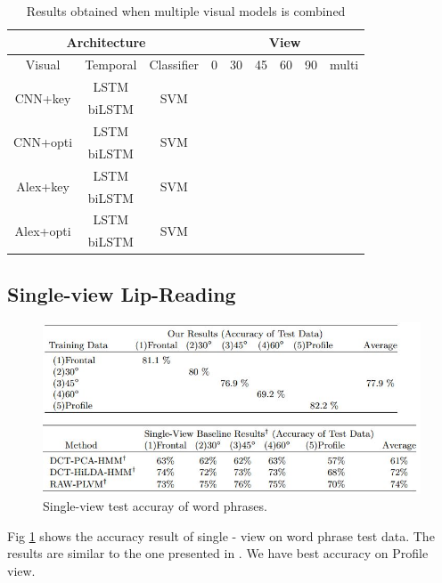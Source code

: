 \begin{table}[h]
\centering
    \begin{tabular}{ccc|cccccc}
        \multicolumn{3}{c|}{Architecture} &%
        \multicolumn{6}{c}{View}\\ \hline
        Visual  & Temporal & Classifier &%
        0& 30 & 45 & 60 & 90 & multi\\\hline
        \multirow{2}{*}{CNN+key}%
        & LSTM & \multirow{2}{*}{SVM} &%
        & & & & &\\
        & biLSTM & &%
        & & & & &\\
        \multirow{2}{*}{CNN+opti}%
        & LSTM & \multirow{2}{*}{SVM} &%
        & & & & &\\
        & biLSTM & &%
        & & & & &\\
        \multirow{2}{*}{Alex+key}%
        & LSTM & \multirow{2}{*}{SVM} &%
        & & & & &\\
        & biLSTM & &%
        & & & & &\\
        \multirow{2}{*}{Alex+opti}%
        & LSTM & \multirow{2}{*}{SVM} &%
        & & & & &\\
        & biLSTM & &%
        & & & & &\\
    \end{tabular}
    \caption{Results obtained when multiple visual models is combined}
    \label{tab:resDiffArch}
\end{table}


\subsection{Single-view Lip-Reading}

\begin{figure}[h]
	\centering
	\includegraphics[width=\columnwidth]{fig/s1.jpg}
	\caption{Single-view test accuray of word phrases.}
	\label{fig:s1}
\end{figure}
Fig \ref{fig:s1} shows the accuracy result of single - view on word phrase test data. The results are similar to the one presented in \cite{Lee}. We have best accuracy on Profile view.

